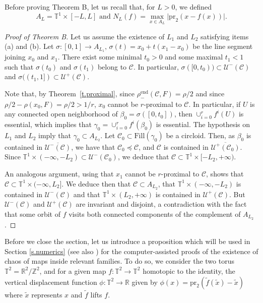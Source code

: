 \documentclass[12pt,a4paper]{amsart}
\theoremstyle{definition}
\theoremstyle{remark}
\newcommand{\T}{\mathbb{T}}
\newcommand{\R}{\mathbb{R}}
\newcommand{\Z}{\mathbb{Z}}
\begin{document}
\smallskip

Before proving Theorem B, let us recall that, for $L>0$, we defined 
$$A_L=\T^1\times[-L,L]\mbox{ and }N_L(f)=\max_{x\in A_L}\vert \mathrm{pr}_2\left(x-f(x)\right)\vert.$$ 

\smallskip

\begin{proof}[Proof of Theorem B]{\color{black} 
  Let us assume the existence of $L_1$ and $L_2$ satisfying items (a) and (b). Let $\sigma:[0,1]\to A_{L_1}, \,\sigma(t)=x_0+t(x_1-x_0)$ be the line segment joining $x_0$ and $x_1$. There exist some minimal $t_0>0$ and some maximal $t_1<1$ such that $\sigma(t_0)$ and $\sigma(t_1)$ belong to $\mathcal{C}$. In particular, $\sigma([0,t_0))\subset \mathcal{U}^{-}(\mathcal{C})$ and $\sigma((t_1,1])\subset \mathcal{U}^{+}(\mathcal{C})$.

Note that, by Theorem~\ref{t.proximal}, since $\rho^{\mathrm{end}}_{-}(\mathcal{C},F)=\rho/2$ and since $\rho/2-\rho(x_0,F)=\rho/2>1/r$, $x_0$ cannot be $r$-proximal to $\mathcal{C}$. In particular, if $U$ is any connected open  neighborhood of $\beta_0=\sigma([0,t_0])$, then $\cup_{i=0}^{r}f^{ i}(U)$ is essential, which implies that $\gamma_0=\cup_{i=0}^{r}f^{ i}(\beta_0)$ is essential. The hypothesis on $L_1$ and $L_2$ imply that $\gamma_0\subset A_{L_2}$. Let $\mathcal{C}_0\subset \mathrm{Fill}(\gamma_0)$ be a circloid. Then, as $\beta_0$ is contained in $\overline{\mathcal{U}^{-}(\mathcal{C})}$, we have that $\mathcal{C}_0\preceq\mathcal{C}$, and $\mathcal{C}$ is contained in $\overline{\mathcal{U}^{+}(\mathcal{C}_0)}$. Since $\T^1\times (-\infty,-L_2)\subset \mathcal{U}^{-}(\mathcal{C}_0)$, we deduce that $\mathcal{C}\subset \T^1\times [-L_2,+\infty)$.

An analogous argument, using that $x_1$ cannot be $r$-proximal to $\mathcal{C}$, shows that  $\mathcal{C}\subset \T^1\times (-\infty, L_2]$. We deduce then that $\mathcal{C}\subset A_{L_2}$, that $\T^1\times(-\infty, -L_2)$ is contained in $\mathcal{U}^{-}(\mathcal{C})$ and that $\T^1\times(L_2,+\infty)$ is contained in $\mathcal{U}^{+}(\mathcal{C})$. But $\mathcal{U}^{-}(\mathcal{C})$ and $\mathcal{U}^{+}(\mathcal{C})$ are invariant and disjoint, a contradiction with the fact that some orbit of $f$ visits both connected components of the complement of $A_{L_2}$.} 
\end{proof}


Before we close the section, let us introduce a proposition which will be used in Section \ref{s.numerics}
(see also \cite{theoappandnumer}) for the computer-assisted proofs
of the existence of chaos of maps inside relevant families. To do so, we consider the two torus 
$\mathbb{T}^2=\R^2/\Z^2$, and for a given
map $f:\T^2\to\T^2$ homotopic to the identity, the vertical displacement function $\phi:\T^2\to\R$ given by 
$\phi(x)=\mathrm{pr}_2(\tilde{f}(\tilde{x})-\tilde{x})$ where $\tilde{x}$ represents $x$
and $\tilde{f}$ lifts $f$.
\end{document}

